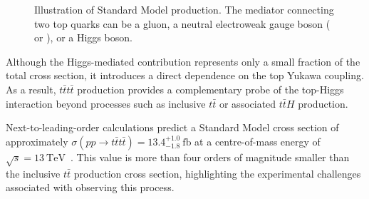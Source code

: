 \begin{figure}[htbp]
\begin{subfigure}[b]{0.45\textwidth}
\end{subfigure}
\caption{Illustration of Standard Model \ttttsym{} production. The mediator connecting two top quarks can be a gluon, a neutral electroweak gauge boson (\gammasym{} or \Zsym{}), or a Higgs boson.}
\label{fig:four-tops-schematic}
\end{figure}

Although the Higgs-mediated contribution represents only a small fraction of the total cross section, it introduces a direct dependence on the top Yukawa coupling.
As a result, $t\bar{t}t\bar{t}$ production provides a complementary probe of the top-Higgs interaction beyond processes such as inclusive $t\bar{t}$ or associated $t\bar{t}H$ production.

Next-to-leading-order calculations predict a Standard Model cross section of approximately $\sigma(pp \to t\bar{t}t\bar{t}) = 13.4^{+1.0}_{-1.8}~\mathrm{fb}$ at a centre-of-mass energy of $\sqrt{s}=13~\mathrm{TeV}$~\cite{vanBeekveld:2022hty}.
This value is more than four orders of magnitude smaller than the inclusive $t\bar{t}$ production cross section, highlighting the experimental challenges associated with observing this process.

